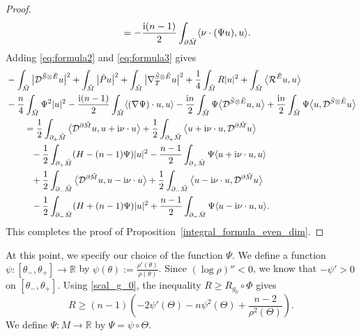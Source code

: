 \documentclass[11pt]{article}
\numberwithin{equation}{section}
\numberwithin{equation}{section}
\newcommand{\R}{\mathbb{R}}
\begin{document}
\begin{proof}
\begin{align}
&\qquad= -\frac{{\rm i}(n-1)}{2} \int_{\partial \tilde{M}} \langle \nu \cdot (\Psi u),u \rangle.\label{eq:formula3}
\end{align}
Adding \eqref{eq:formula2} and \eqref{eq:formula3} gives
\begin{align*}
&- \int_{\tilde{M}} \big|\mathcal{D}^{\tilde{S} \otimes \tilde{E}} u\big|^2 + \int_{\tilde{M}} \big|\tilde{P} u\big|^2 + \int_{\tilde{M}} \big|\nabla_T^{\tilde{S} \otimes \tilde{E}} u\big|^2 + \frac{1}{4} \int_{\tilde{M}} R |u|^2
+ \int_{\tilde{M}} \big\langle \mathcal{R}^{\tilde{E}} u,u \big\rangle \\
&- \frac{n}{4} \int_{\tilde{M}} \Psi^2 |u|^2 - \frac{{\rm i}(n-1)}{2} \int_{\tilde{M}} \langle (\nabla \Psi) \cdot u,u \rangle
- \frac{{\rm i}n}{2} \int_{\tilde{M}} \Psi \big\langle \mathcal{D}^{\tilde{S} \otimes \tilde{E}} u,u \big\rangle + \frac{{\rm i}n}{2} \int_{\tilde{M}} \Psi \big\langle u,\mathcal{D}^{\tilde{S} \otimes \tilde{E}} u \big\rangle\\
&\qquad= \frac{1}{2} \int_{\partial_+ \tilde{M}} \big\langle \mathcal{D}^{\partial \tilde{M}} u,u + {\rm i} \nu \cdot u \big\rangle + \frac{1}{2} \int_{\partial_+ \tilde{M}} \big\langle u + {\rm i} \nu \cdot u,\mathcal{D}^{\partial \tilde{M}} u \big\rangle \\
&\phantom{\qquad=}{} - \frac{1}{2} \int_{\partial_+ \tilde{M}} (H-(n-1)\Psi) |u|^2 - \frac{n-1}{2} \int_{\partial_+ \tilde{M}} \Psi \langle u + {\rm i} \nu \cdot u,u \rangle \\
&\phantom{\qquad=}{} + \frac{1}{2} \int_{\partial_- \tilde{M}} \big\langle \mathcal{D}^{\partial \tilde{M}} u,u - {\rm i} \nu \cdot u \big\rangle + \frac{1}{2} \int_{\partial_- \tilde{M}} \big\langle u - {\rm i} \nu \cdot u,\mathcal{D}^{\partial \tilde{M}} u \big\rangle \\
&\phantom{\qquad=}{} - \frac{1}{2} \int_{\partial_- \tilde{M}} (H+(n-1)\Psi) |u|^2 + \frac{n-1}{2} \int_{\partial_- \tilde{M}} \Psi \langle u - {\rm i} \nu \cdot u,u \rangle.
\end{align*}
This completes the proof of Proposition~\ref{integral_formula_even_dim}.
\end{proof}

At this point, we specify our choice of the function $\Psi$. We define a function $\psi\colon [\theta_-, \theta_+] \to \R$ by $\psi(\theta) := \frac{\rho'(\theta)}{\rho(\theta)}$.
Since $(\log \rho)''<0$, we know that $-\psi' > 0$ on $[\theta_-,\theta_+]$.
Using \eqref{scal_g_0}, the inequality $R \geq R_{g_0} \circ \Phi$ gives
\begin{equation} \label{ineq_for_scal_even_dim}
R \geq (n-1) \left( -2 \psi'(\Theta) - n \psi^2(\Theta) + \frac{n-2}{\rho^2(\Theta)} \right).
\end{equation}
We define $\Psi\colon M \to \R$ by $\Psi = \psi \circ \Theta$.
\end{document}
